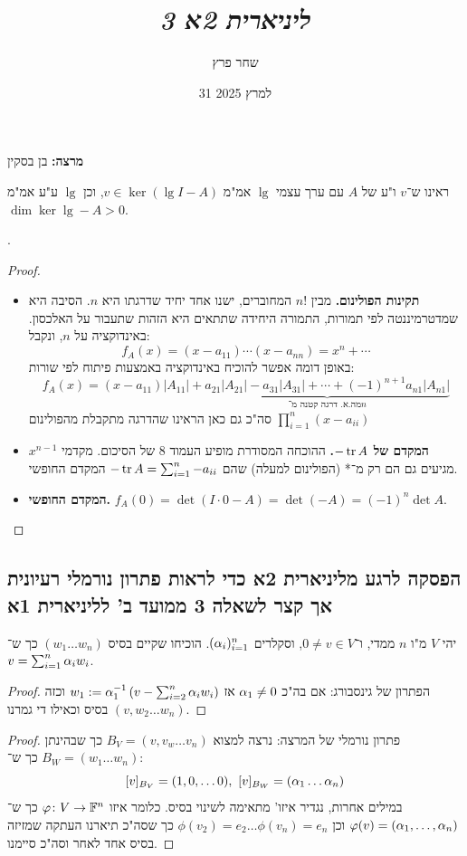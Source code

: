 \documentclass[]{../../../../tex/classes/styledArticle}
\author{שחר פרץ}
\title{\textit{ליניארית 2א 3}}
\date{31 למרץ 2025}
\begin{document}
	\maketitle
	\textbf{מרצה: }בן בסקין
	
	
	ראינו ש־$v$ ו"ע של $A$ עם ערך עצמי $\lg$ אמ"מ $v \in \ker(\lg I - A)$, וכן $\lg$ ע"ע אמ"מ $\dim \ker \lg - A > 0$. 
	
	. 
	
	\begin{proof}
		\begin{itemize}
			\item\textbf{ תקינות הפולינום. }מבין $n!$ המחוברים, ישנו אחד יחיד שדרגתו היא $n$. הסיבה היא שמדטרמיננטה לפי תמורות, התמורה היחידה שתתאים היא הזהות שתעבור על האלכסון. באינדוקציה על $n$, ונקבל: 
			\[ f_A(x) = (x - a_{11}) \cdots (x - a_{nn}) = x^{n} + \cdots \]
			באופן דומה אפשר להוכיח באינדוקציה באמצעות פיתוח לפי שורות: 
			\[ f_A(x) = (x - a_{11})|A_11| + \underbrace{a_{21}|A_21| - a_{31}|A_31| + \cdots + (-1)^{n + 1}a_{n1}|A_{n1}|}_{\text{מה.א. דרגה קטנה מ־$n$}} \]
			סה"כ גם כאן הראינו שהדרגה מתקבלת מהפולינום $\prod^{n}_{i = 1}(x - a_{ii})$
			
			\item\textbf{המקדם של $-\operatorname{tr} A$. }ההוכחה המסודרת מופיע העמוד 8 של הסיכום. מקדמי $x^{n - 1}$ מגיעים גם הם רק מ־* (הפולינום למעלה) שהם $-\operatorname{tr} A = \sum_{i = 1}^{n}-a_{ii}$ המקדם החופשי. 
			\item\textbf{המקדם החופשי. }$f_A(0) = \det(I \cdot 0 - A) = \det(-A) = (-1)^{n}\det A$. 
		\end{itemize}
	\end{proof}
	
	\subsection{הפסקה לרגע מליניארית 2א כדי לראות פתרון נורמלי רעיונית אך קצר לשאלה 3 ממועד ב' לליניארית 1א}
	יהי $V$ מ"ו $n$ ממדי, ו־$0 \neq v \in V$, וסקלרים $(\alpha_i)_{i = 1}^{n}$. הוכיחו שקיים בסיס $(w_1 \dots w_n)$ כך ש־$v = \sum_{i = 1}^{n}\alpha_iw_i$. 
	\begin{proof}הפתרון של גינסבורג: 
		אם בה"כ $\alpha_1 \neq 0$ אז $w_1 := \alpha_1^{-1}\left ( v - \sum_{i = 2}^{n}\alpha_iw_i \right )$ וכזה $(v, w_2 \dots w_n)$ בסיס וכאילו די גמרנו. 
	\end{proof}
	\begin{proof}פתרון נורמלי של המרצה: 
		נרצה למצוא $B_V = (v, v_w \dots v_n)$ כך שבהינתן $B_W = (w_1 \dots w_n)$ כך ש־: 
		\[ [v]_{B_V} = (1, 0, \dots 0), \ [v]_{B_{W}} = (\ag_1 \dots \ag_n) \]
		במילים אחרות, נגדיר איזו' מתאימה לשינוי בסיס. כלומר איזו $\varphi \colon V \to \mathbb{F}^n$ כך ש־$\varphi(v) = (\alpha_1, \dots, \alpha_n)$ וכן $\phi(v_2) = e_2 \dots \phi(v_n) = e_n$ כך שסה"כ תיארנו העתקה שמזיזה בסיס אחד לאחר וסה"כ סיימנו. 
	\end{proof}
	
\end{document}
